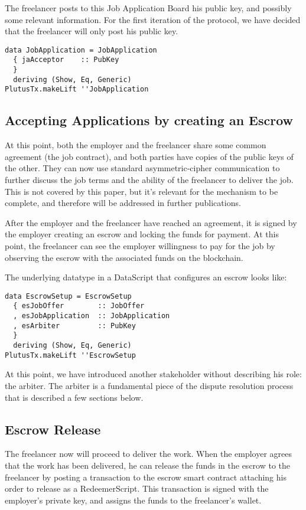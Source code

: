 \documentclass{article}
\begin{document}
The freelancer posts to this Job Application Board his public key, and possibly some relevant information. For the first iteration of the protocol, we have decided that the freelancer will only post his public key.

\begin{samepage}
\begin{verbatim}
data JobApplication = JobApplication
  { jaAcceptor    :: PubKey
  }
  deriving (Show, Eq, Generic)
PlutusTx.makeLift ''JobApplication
\end{verbatim}
\end{samepage}

\subsection{Accepting Applications by creating an Escrow}
At this point, both the employer and the freelancer share some common agreement (the job contract), and both parties have copies of the public keys of the other. They can now use standard asymmetric-cipher communication to further discuss the job terms and the ability of the freelancer to deliver the job. This is not covered by this paper, but it's relevant for the mechanism to be complete, and therefore will be addressed in further publications.

After the employer and the freelancer have reached an agreement, it is signed by the employer creating an escrow and locking the funds for payment. At this point, the freelancer can see the employer willingness to pay for the job by observing the escrow with the associated funds on the blockchain.

The underlying datatype in a DataScript that configures an escrow looks like:

\begin{samepage}
\begin{verbatim}
data EscrowSetup = EscrowSetup
  { esJobOffer        :: JobOffer
  , esJobApplication  :: JobApplication
  , esArbiter         :: PubKey
  }
  deriving (Show, Eq, Generic)
PlutusTx.makeLift ''EscrowSetup
\end{verbatim}
\end{samepage}

At this point, we have introduced another stakeholder without describing his role: the arbiter. The arbiter is a fundamental piece of the dispute resolution process that is described a few sections below.

\subsection{Escrow Release}
The freelancer now will proceed to deliver the work. When the employer agrees that the work has been delivered, he can release the funds in the escrow to the freelancer by posting a transaction to the escrow smart contract attaching his order to release as a RedeemerScript. This transaction is signed with the employer's private key, and assigns the funds to the freelancer's wallet.
\end{document}
